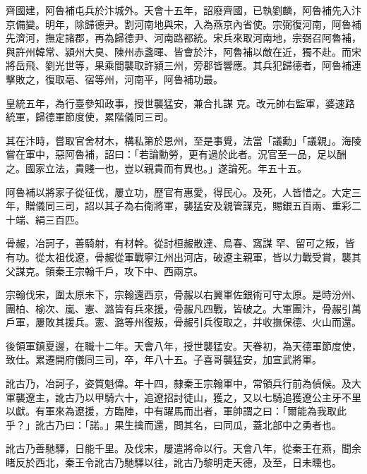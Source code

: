 \begin{pinyinscope}
 齊國建，阿魯補屯兵於汴城外。天會十五年，詔廢齊國，已執劉麟，阿魯補先入汴京備變。明年，除歸德尹。割河南地與宋，入為燕京內省使。宗弼復河南，阿魯補先濟河，撫定諸郡，再為歸德尹、河南路都統。宋兵來取河南地，宗弼召阿魯補，與許州韓常、潁州大臭、陳州赤盞暉、皆會於汴，阿魯補以敵在近，獨不赴。而宋將岳飛、劉光世等，果乘間襲取許潁三州，旁郡皆響應。其兵犯歸德者，阿魯補連擊敗之，復取亳、宿等州，河南平，阿魯補功最。



 皇統五年，為行臺參知政事，授世襲猛安，兼合扎謀
 克。改元帥右監軍，婆速路統軍，歸德軍節度使，累階儀同三司。



 其在汴時，嘗取官舍材木，構私第於恩州，至是事覺，法當「議勳」「議親」。海陵嘗在軍中，惡阿魯補，詔曰：「若論勳勞，更有過於此者。況官至一品，足以酬之。國家立法，貴賤一也，豈以親貴而有異也。」遂論死。年五十五。



 阿魯補以將家子從征伐，屢立功，歷官有惠愛，得民心。及死，人皆惜之。大定三年，贈儀同三司，詔以其子為右衛將軍，襲猛安及親管謀克，賜銀五百兩、重彩二十端、絹三百匹。



 骨赧，冶訶子，善騎射，有材幹。從討桓赧散達、烏春、窩謀
 罕、留可之叛，皆有功。從太祖伐遼，骨赧從軍戰寧江州出河店，破遼主親軍，皆以力戰受賞，襲其父謀克。領秦王宗翰千戶，攻下中、西兩京。



 宗翰伐宋，圍太原未下，宗翰還西京，骨赧以右翼軍佐銀術可守太原。是時汾州、團柏、榆次、嵐、憲、潞皆有兵來援，骨赧凡四戰，皆破之。大軍團汴，骨赧引萬戶軍，屢敗其援兵。憲、潞等州復叛，骨赧引兵復取之，并收撫保德、火山而還。



 後領軍鎮夏邊，在職十二年。天會八年，授世襲猛安。天眷初，為天德軍節度使，致仕。累遷開府儀同三司，卒，年八十五。子喜哥襲猛安，加宣武將軍。



 訛古乃，冶訶子，姿質魁偉。年十四，隸秦王宗翰軍中，常領兵行前為偵候。及大軍襲遼主，訛古乃以甲騎六十，追遼招討徒山，獲之，又以七騎追獲遼公主牙不里以獻。有軍來為遼援，方臨陣，中有躍馬而出者，軍帥謂之曰：「爾能為我取此乎？」訛古乃曰：「諾。」果生擒而還，問其名，曰同瓜，蓋北部中之勇者也。



 訛古乃善馳驛，日能千里。及伐宋，屢遣將命以行。天會八年，從秦王在燕，聞余睹反於西北，秦王令訛古乃馳驛以往，訛古乃黎明走天德，及至，日未曛也。




\end{pinyinscope}
